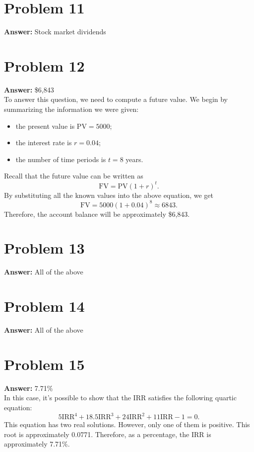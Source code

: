 \documentclass[11pt]{article}
\begin{document}
\section*{Problem 11}
\label{sec:org9837608}

\textbf{Answer:} Stock market dividends
\section*{Problem 12}
\label{sec:org1e66b55}

\textbf{Answer:} \$6,843\\

To answer this question, we need to compute a future value. We begin by
summarizing the information we were given:
\begin{itemize}
\item the present value is \(\mathrm{PV}=5000\);
\item the interest rate is \(r=0.04\);
\item the number of time periods is \(t=8\) years.
\end{itemize}
Recall that the future value can be written as
\begin{equation}
\mathrm{FV}=\mathrm{PV}(1+r)^t.
\end{equation}
By substituting all the known values into the above equation, we get
\begin{equation}
\mathrm{FV}=5000(1+0.04)^8\approx 6843.
\end{equation}
Therefore, the account balance will be approximately \$6,843.
\section*{Problem 13}
\label{sec:org61e75eb}

\textbf{Answer:} All of the above
\section*{Problem 14}
\label{sec:org9c946ab}

\textbf{Answer:} All of the above
\section*{Problem 15}
\label{sec:org9dc73f0}

\textbf{Answer:} 7.71\%\\

In this case, it's possible to show that the \(\mathrm{IRR}\) satisfies the
following quartic equation:
\begin{equation}
5\mathrm{IRR}^4+18.5\mathrm{IRR}^3+24\mathrm{IRR}^2+11\mathrm{IRR}-1=0.
\end{equation}
This equation has two real solutions. However, only one of them is positive.
This root is approximately 0.0771. Therefore, as a percentage, the
\(\mathrm{IRR}\) is approximately 7.71\%.
\end{document}
